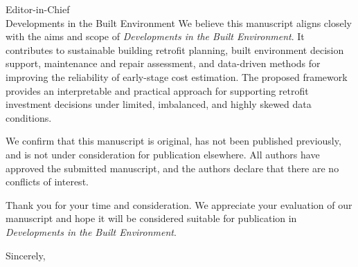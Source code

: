 \documentclass[11pt]{letter}
\begin{document}
\begin{letter}{Editor-in-Chief\\Developments in the Built Environment}
We believe this manuscript aligns closely with the aims and scope of \textit{Developments in the Built Environment}. It contributes to sustainable building retrofit planning, built environment decision support, maintenance and repair assessment, and data-driven methods for improving the reliability of early-stage cost estimation. The proposed framework provides an interpretable and practical approach for supporting retrofit investment decisions under limited, imbalanced, and highly skewed data conditions.

We confirm that this manuscript is original, has not been published previously, and is not under consideration for publication elsewhere. All authors have approved the submitted manuscript, and the authors declare that there are no conflicts of interest.

Thank you for your time and consideration. We appreciate your evaluation of our manuscript and hope it will be considered suitable for publication in \textit{Developments in the Built Environment}.

\closing{Sincerely,}

\end{letter}
\end{document}
